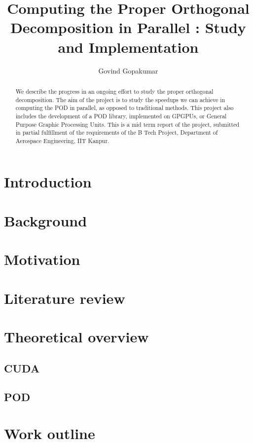 \documentclass[]{aiaa-tc}%
\title{ Computing the Proper Orthogonal Decomposition in Parallel : 
	 Study and Implementation}
\author{ Govind Gopakumar }
\begin{document}
\maketitle

\begin{abstract}
We describe the progress in an ongoing effort to study the proper orthogonal decomposition.
The aim of the project is to study the speedups we can achieve in computing the POD in parallel,
as opposed to traditional methods. This project also includes the development of a POD library, 
implemented on GPGPUs, or General Purpose Graphic Processing Units. This is a mid term report of
the project, submitted in partial fulfillment of the requirements of the B Tech Project,
Department of Aerospace Engineering, IIT Kanpur.
\end{abstract}

\section{Introduction}

\section{Background}

\section{Motivation}

\section{Literature review}

\section{Theoretical overview}
\subsection{CUDA}
\subsection{POD}

\section{Work outline}


\begin{thebibliography}{9}%
\end{thebibliography}
\end{document}
